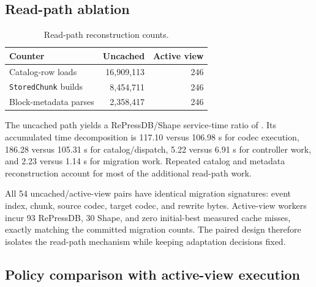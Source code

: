 \documentclass[preprint,12pt,authoryear]{elsarticle}
\begin{document}
\subsection{Read-path ablation}

\begin{table}[H]
\centering
\caption{Read-path reconstruction counts.}
\begin{tabular}{@{}lrr@{}}
\toprule
Counter & Uncached & Active view \\
\midrule
Catalog-row loads & 16,909,113 & 246 \\
\texttt{StoredChunk} builds & 8,454,711 & 246 \\
Block-metadata parses & 2,358,417 & 246 \\
\bottomrule
\end{tabular}
\end{table}

The uncached path yields a RePressDB/Shape service-time ratio of \LegacyDiagnosticRepressShape. Its accumulated time decomposition is 117.10 versus 106.98 s for codec execution, 186.28 versus 105.31 s for catalog/dispatch, 5.22 versus 6.91 s for controller work, and 2.23 versus 1.14 s for migration work. Repeated catalog and metadata reconstruction account for most of the additional read-path work.

All 54 uncached/active-view pairs have identical migration signatures: event index, chunk, source codec, target codec, and rewrite bytes. Active-view workers incur 93 RePressDB, 30 Shape, and zero initial-best measured cache misses, exactly matching the committed migration counts. The paired design therefore isolates the read-path mechanism while keeping adaptation decisions fixed.

\subsection{Policy comparison with active-view execution}

\begin{table}[H]
\centering
\caption{Policy ratios with active-view execution.}
\end{table}
\end{document}
